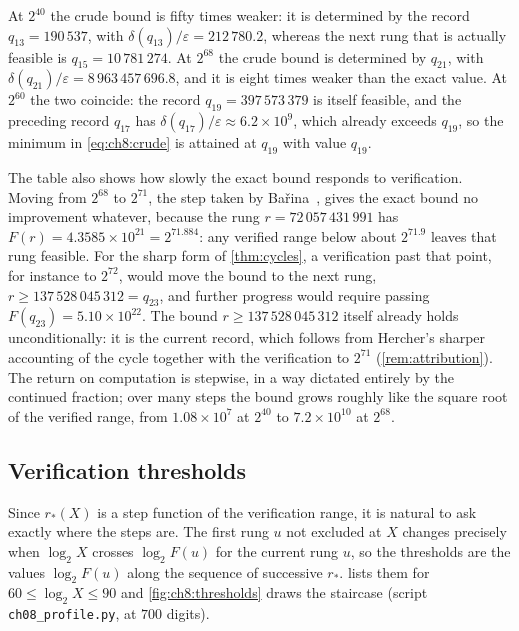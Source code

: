 At $2^{40}$ the crude bound is fifty times weaker: it is determined by the
record $q_{13}=190\,537$, with $\delta(q_{13})/\varepsilon=212\,780.2$, whereas
the next rung that is actually feasible is $q_{15}=10\,781\,274$. At $2^{68}$
the crude bound is determined by $q_{21}$, with
$\delta(q_{21})/\varepsilon=8\,963\,457\,696.8$, and it is eight times weaker
than the exact value. At $2^{60}$ the two coincide: the record $q_{19}=397\,573\,379$ is
itself feasible, and the preceding record $q_{17}$ has
$\delta(q_{17})/\varepsilon\approx6.2\times10^{9}$, which already exceeds
$q_{19}$, so the minimum in \eqref{eq:ch8:crude} is attained at $q_{19}$
with value $q_{19}$.

The table also shows how slowly the exact bound responds to verification.
Moving from $2^{68}$ to $2^{71}$, the step taken by Ba\v{r}ina~\cite{barina2025}, gives the exact bound no improvement whatever, because the
rung $r=72\,057\,431\,991$ has $F(r)=4.3585\times10^{21}=2^{71.884}$: any
verified range below about $2^{71.9}$ leaves that rung feasible. For the sharp form of \cref{thm:cycles}, a
verification past that point, for instance to $2^{72}$, would move the bound
to the next rung, $r\geq137\,528\,045\,312=q_{23}$, and further progress would
require passing $F(q_{23})=5.10\times10^{22}$. The bound $r\geq137\,528\,045\,312$ itself already holds unconditionally: it is the current record, which follows from Hercher's sharper accounting of the cycle together with the verification to $2^{71}$ (\cref{rem:attribution}).
The return on computation is
stepwise, in a way dictated entirely by the
continued fraction; over many steps the bound grows roughly like the
square root of the verified range, from $1.08\times10^{7}$ at $2^{40}$ to
$7.2\times10^{10}$ at $2^{68}$.


\subsection{Verification thresholds}\label{sec:ch8:thresholds}

Since $r_*(X)$ is a step function of the verification range, it is natural to
ask exactly where the steps are. The first rung $u$ not excluded at $X$ changes
precisely when $\log_2X$ crosses $\log_2F(u)$ for the current rung $u$, so the
thresholds are the values $\log_2F(u)$ along the sequence of successive
$r_*$.  lists them for $60\le\log_2X\le90$ and
\cref{fig:ch8:thresholds} draws the staircase (script
\texttt{ch08\_profile.py}, at $700$ digits).

